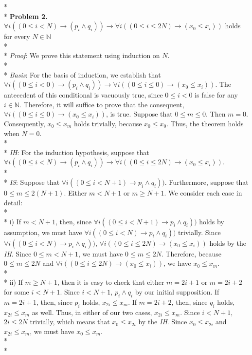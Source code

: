 \documentclass[12pt]{article}
\begin{document}
$\>$\\*\\*
\textbf{Problem 2.} $\forall i((0\leq i<N)\rightarrow(p_i\wedge q_i))\rightarrow\forall i((0\leq i\leq2N)\rightarrow(x_0\leq x_i))$ holds for every $N\in\mathbb{N}$\\*\\*
\textit{Proof}: We prove this statement using induction on $N$.\\*\\*
\textit{Basis}: For the basis of induction, we establish that $\forall i((0\leq i<0)\rightarrow(p_i\wedge q_i))\rightarrow\forall i((0\leq i\leq 0)\rightarrow(x_0\leq x_i))$. The antecedent of this conditional is vacuously true, since $0\leq i<0$ is false for any $i\in\mathbb{N}$. Therefore, it will suffice to prove that the consequent, $\forall i((0\leq i\leq 0)\rightarrow(x_0\leq x_i))$, is true. Suppose that $0\leq m\leq0$. Then $m=0$. Consequently, $x_0\leq x_m$ holds trivially, because $x_0\leq x_0$. Thus, the theorem holds when $N=0$.\\*\\*
\textit{IH}: For the induction hypothesis, suppose that $\forall i((0\leq i<N)\rightarrow(p_i\wedge q_i))\rightarrow\forall i((0\leq i\leq2N)\rightarrow(x_0\leq x_i))$.\\*\\*
\textit{IS}: Suppose that $\forall i((0\leq i<N+1)\rightarrow p_i\wedge q_i))$. Furthermore, suppose that $0\leq m\leq2(N+1)$. Either $m<N+1$ or $m\geq N+1$. We consider each case in detail:\\*\\*
i) If $m<N+1$, then, since $\forall i((0\leq i<N+1)\rightarrow p_i\wedge q_i))$ holds by assumption, we must have $\forall i((0\leq i<N)\rightarrow p_i\wedge q_i))$ trivially. Since $\forall i((0\leq i<N)\rightarrow p_i\wedge q_i))$, $\forall i((0\leq i\leq2N)\rightarrow(x_0\leq x_i))$ holds by the \textit{IH}. Since $0\leq m<N+1$, we must have $0\leq m\leq2N$. Therefore, because $0\leq m\leq2N$ and $\forall i((0\leq i\leq2N)\rightarrow(x_0\leq x_i))$, we have $x_0\leq x_m$.\\*\\*
ii) If $m\geq N+1$, then it is easy to check that either $m=2i+1$ or $m=2i+2$ for some $i<N+1$. Since $i<N+1$, $p_i\wedge q_i$ by our initial supposition. If $m=2i+1$, then, since $p_i$ holds, $x_{2i}\leq x_m$. If $m=2i+2$, then, since $q_i$ holds, $x_{2i}\leq x_m$ as well. Thus, in either of our two cases, $x_{2i}\leq x_m$. Since $i<N+1$, $2i\leq2N$ trivially, which means that $x_0\leq x_{2i}$ by the \textit{IH}. Since $x_0\leq x_{2i}$ and $x_{2i}\leq x_m$, we must have $x_0\leq x_m$.\\*\\*
\end{document}
